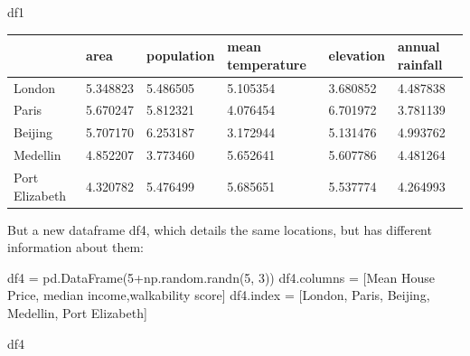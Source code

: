 \documentclass[
  letterpaper,
  DIV=11,
  numbers=noendperiod]{scrreprt}
\newenvironment{Shaded}{\begin{snugshade}}{\end{snugshade}}
\newcommand{\DecValTok}[1]{\textcolor[rgb]{0.68,0.00,0.00}{#1}}
\newcommand{\NormalTok}[1]{\textcolor[rgb]{0.00,0.23,0.31}{#1}}
\newcommand{\OperatorTok}[1]{\textcolor[rgb]{0.37,0.37,0.37}{#1}}
\newcommand{\StringTok}[1]{\textcolor[rgb]{0.13,0.47,0.30}{#1}}
\begin{document}
\begin{Shaded}
\begin{Highlighting}[]
\NormalTok{df1}
\end{Highlighting}
\end{Shaded}

\begin{longtable}[]{@{}llllll@{}}
\toprule()
& area & population & mean temperature & elevation & annual rainfall \\
\midrule()
\endhead
London & 5.348823 & 5.486505 & 5.105354 & 3.680852 & 4.487838 \\
Paris & 5.670247 & 5.812321 & 4.076454 & 6.701972 & 3.781139 \\
Beijing & 5.707170 & 6.253187 & 3.172944 & 5.131476 & 4.993762 \\
Medellin & 4.852207 & 3.773460 & 5.652641 & 5.607786 & 4.481264 \\
Port Elizabeth & 4.320782 & 5.476499 & 5.685651 & 5.537774 & 4.264993 \\
\bottomrule()
\end{longtable}

But a new dataframe df4, which details the same locations, but has
different information about them:

\begin{Shaded}
\begin{Highlighting}[]
\NormalTok{df4 }\OperatorTok{=}\NormalTok{ pd.DataFrame(}\DecValTok{5}\OperatorTok{+}\NormalTok{np.random.randn(}\DecValTok{5}\NormalTok{, }\DecValTok{3}\NormalTok{))}
\NormalTok{df4.columns }\OperatorTok{=}\NormalTok{ [}\StringTok{\textquotesingle{}Mean House Price\textquotesingle{}}\NormalTok{, }\StringTok{\textquotesingle{}median income\textquotesingle{}}\NormalTok{,}\StringTok{\textquotesingle{}walkability score\textquotesingle{}}\NormalTok{]}
\NormalTok{df4.index }\OperatorTok{=}\NormalTok{ [}\StringTok{\textquotesingle{}London\textquotesingle{}}\NormalTok{, }\StringTok{\textquotesingle{}Paris\textquotesingle{}}\NormalTok{, }\StringTok{\textquotesingle{}Beijing\textquotesingle{}}\NormalTok{, }\StringTok{\textquotesingle{}Medellin\textquotesingle{}}\NormalTok{, }\StringTok{\textquotesingle{}Port Elizabeth\textquotesingle{}}\NormalTok{]}
\end{Highlighting}
\end{Shaded}

\begin{Shaded}
\begin{Highlighting}[]
\NormalTok{df4}
\end{Highlighting}
\end{Shaded}
\end{document}
